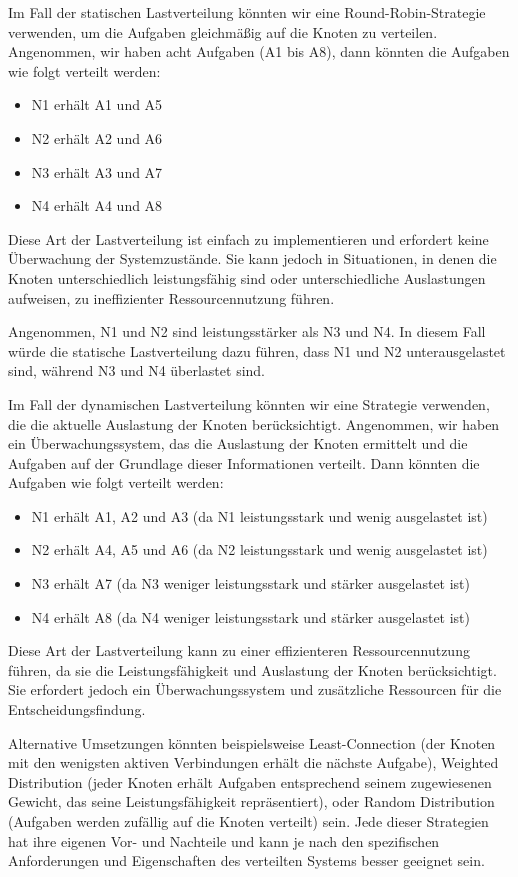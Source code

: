 Im Fall der statischen Lastverteilung könnten wir eine Round-Robin-Strategie verwenden, um die Aufgaben gleichmäßig auf die Knoten zu verteilen. Angenommen, wir haben acht Aufgaben (A1 bis A8), dann könnten die Aufgaben wie folgt verteilt werden:
\begin{itemize}
\item N1 erhält A1 und A5
\item N2 erhält A2 und A6
\item N3 erhält A3 und A7
\item N4 erhält A4 und A8
\end{itemize}
Diese Art der Lastverteilung ist einfach zu implementieren und erfordert keine Überwachung der Systemzustände. Sie kann jedoch in Situationen, in denen die Knoten unterschiedlich leistungsfähig sind oder unterschiedliche Auslastungen aufweisen, zu ineffizienter Ressourcennutzung führen.

Angenommen, N1 und N2 sind leistungsstärker als N3 und N4. In diesem Fall würde die statische Lastverteilung dazu führen, dass N1 und N2 unterausgelastet sind, während N3 und N4 überlastet sind.

Im Fall der dynamischen Lastverteilung könnten wir eine Strategie verwenden, die die aktuelle Auslastung der Knoten berücksichtigt. Angenommen, wir haben ein Überwachungssystem, das die Auslastung der Knoten ermittelt und die Aufgaben auf der Grundlage dieser Informationen verteilt. Dann könnten die Aufgaben wie folgt verteilt werden:
\begin{itemize}
\item N1 erhält A1, A2 und A3 (da N1 leistungsstark und wenig ausgelastet ist)
\item N2 erhält A4, A5 und A6 (da N2 leistungsstark und wenig ausgelastet ist)
\item N3 erhält A7 (da N3 weniger leistungsstark und stärker ausgelastet ist)
\item N4 erhält A8 (da N4 weniger leistungsstark und stärker ausgelastet ist)
\end{itemize}
Diese Art der Lastverteilung kann zu einer effizienteren Ressourcennutzung führen, da sie die Leistungsfähigkeit und Auslastung der Knoten berücksichtigt. Sie erfordert jedoch ein Überwachungssystem und zusätzliche Ressourcen für die Entscheidungsfindung.

Alternative Umsetzungen könnten beispielsweise Least-Connection (der Knoten mit den wenigsten aktiven Verbindungen erhält die nächste Aufgabe), Weighted Distribution (jeder Knoten erhält Aufgaben entsprechend seinem zugewiesenen Gewicht, das seine Leistungsfähigkeit repräsentiert), oder Random Distribution (Aufgaben werden zufällig auf die Knoten verteilt) sein. Jede dieser Strategien hat ihre eigenen Vor- und Nachteile und kann je nach den spezifischen Anforderungen und Eigenschaften des verteilten Systems besser geeignet sein.


